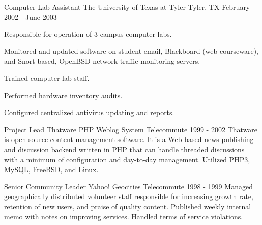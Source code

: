 \begin{cventries}

\cventry
{Computer Lab Assistant}
{The University of Texas at Tyler}
{Tyler, TX}
{February 2002 - June 2003} %
{ %
Responsible for operation of 3 campus computer labs.
\begin{cvitems}
\item[]
\item {Monitored and updated software on student email, Blackboard (web courseware), and Snort-based, OpenBSD network traffic monitoring servers.}
\item {Trained computer lab staff.}
\item {Performed hardware inventory audits.}
\item {Configured centralized antivirus updating and reports.}
\end{cvitems}
}


\cventry
{Project Lead}
{Thatware PHP Weblog System}
{Telecommute}
{1999 - 2002} %
{ %
Thatware is open-source content management software. It is a Web-based news publishing and discussion backend written in PHP that can handle threaded discussions with a minimum of configuration and day-to-day management. Utilized PHP3, MySQL, FreeBSD, and Linux.
}


\cventry
{Senior Community Leader}
{Yahoo! Geocities}
{Telecommute}
{1998 - 1999} %
{ %
Managed geographically distributed volunteer staff responsible for increasing growth rate, retention of new users, and praise of quality content. Published weekly internal memo with notes on improving services. Handled terms of service violations.
}


\end{cventries}
